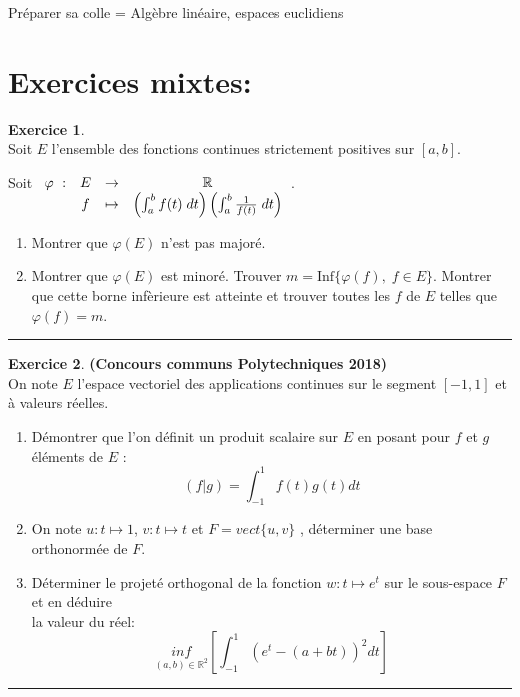 \documentclass[a4paper,10pt]{article}
\theoremstyle{definition}
\theoremstyle{definition}
\newtheorem{exo}{Exercice}
\newcommand{\R}{\mathbb{R}}
\begin{document}
 	

\begin{center}
\Large \sc Préparer sa colle = Algèbre linéaire, espaces euclidiens
\end{center}

\section*{Exercices mixtes:}%

\raggedright

\begin{exo}\quad\\[0.25cm]
	Soit $E$ l'ensemble des fonctions continues strictement positives sur $[a,b]$.
	
	Soit $\begin{array}[t]{cccc}
	\varphi~:&E&\rightarrow&\R\\
	&f&\mapsto&\left(\int_{a}^{b}f(t)\;dt\right)\left(\int_{a}^{b}\frac{1}{f(t)}\;dt\right)
	\end{array}$.
	
	\begin{enumerate}
		\item  Montrer que $\varphi(E)$ n'est pas majoré.
		\item  Montrer que $\varphi(E)$ est minoré. Trouver $m=\mbox{Inf}\{\varphi(f),\;f\in E\}$. Montrer que cette borne infèrieure est atteinte et trouver toutes les $f$ de $E$ telles que $\varphi(f)=m$.
	\end{enumerate}	
	
	
	\centering
	\rule{1\linewidth}{0.6pt}
\end{exo}


\begin{exo}\textbf{(Concours communs Polytechniques 2018)}\quad\\[0.25cm]
	On note $E$ l’espace vectoriel des applications continues sur le segment $[-1,1]$ et à valeurs réelles.
\begin{enumerate}
	\item Démontrer que l’on définit un produit scalaire sur $E$ en posant pour $f$ et $g$ éléments de $E$ :
	$$\left(f|g\right) = \int_{-1}^{1}f(t)g(t)dt$$
	\item On note $u : t \mapsto1$, $v : t \mapsto t$ et $F = vect \{ u , v \}$ , déterminer une base orthonormée de $F$.
	\item Déterminer le projeté orthogonal de la fonction $w : t \mapsto e^t$ sur le sous-espace $F$ et en déduire \\la valeur du réel:
	$$\underset{(a,b)\in\R^2}{inf}\left[\int_{-1}^{1}\left(e^t-(a+bt)\right)^2dt\right]$$
\end{enumerate}
\centering
\rule{1\linewidth}{0.6pt}
\end{exo}
\end{document}
